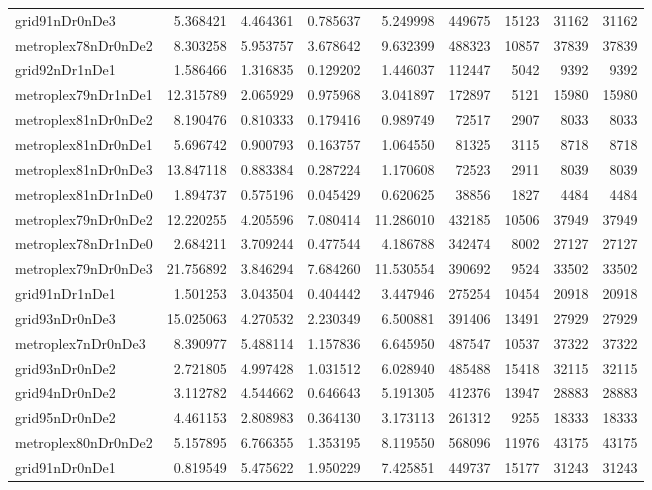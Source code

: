 \begin{longtable}{|l|r|r|r|r|r|r|r|r|}
grid91nDr0nDe3 & 5.368421 & 4.464361 & 0.785637 & 5.249998 & 449675 & 15123 & 31162 & 31162 \\
metroplex78nDr0nDe2 & 8.303258 & 5.953757 & 3.678642 & 9.632399 & 488323 & 10857 & 37839 & 37839 \\
grid92nDr1nDe1 & 1.586466 & 1.316835 & 0.129202 & 1.446037 & 112447 & 5042 & 9392 & 9392 \\
metroplex79nDr1nDe1 & 12.315789 & 2.065929 & 0.975968 & 3.041897 & 172897 & 5121 & 15980 & 15980 \\
metroplex81nDr0nDe2 & 8.190476 & 0.810333 & 0.179416 & 0.989749 & 72517 & 2907 & 8033 & 8033 \\
metroplex81nDr0nDe1 & 5.696742 & 0.900793 & 0.163757 & 1.064550 & 81325 & 3115 & 8718 & 8718 \\
metroplex81nDr0nDe3 & 13.847118 & 0.883384 & 0.287224 & 1.170608 & 72523 & 2911 & 8039 & 8039 \\
metroplex81nDr1nDe0 & 1.894737 & 0.575196 & 0.045429 & 0.620625 & 38856 & 1827 & 4484 & 4484 \\
metroplex79nDr0nDe2 & 12.220255 & 4.205596 & 7.080414 & 11.286010 & 432185 & 10506 & 37949 & 37949 \\
metroplex78nDr1nDe0 & 2.684211 & 3.709244 & 0.477544 & 4.186788 & 342474 & 8002 & 27127 & 27127 \\
metroplex79nDr0nDe3 & 21.756892 & 3.846294 & 7.684260 & 11.530554 & 390692 & 9524 & 33502 & 33502 \\
grid91nDr1nDe1 & 1.501253 & 3.043504 & 0.404442 & 3.447946 & 275254 & 10454 & 20918 & 20918 \\
grid93nDr0nDe3 & 15.025063 & 4.270532 & 2.230349 & 6.500881 & 391406 & 13491 & 27929 & 27929 \\
metroplex7nDr0nDe3 & 8.390977 & 5.488114 & 1.157836 & 6.645950 & 487547 & 10537 & 37322 & 37322 \\
grid93nDr0nDe2 & 2.721805 & 4.997428 & 1.031512 & 6.028940 & 485488 & 15418 & 32115 & 32115 \\
grid94nDr0nDe2 & 3.112782 & 4.544662 & 0.646643 & 5.191305 & 412376 & 13947 & 28883 & 28883 \\
grid95nDr0nDe2 & 4.461153 & 2.808983 & 0.364130 & 3.173113 & 261312 & 9255 & 18333 & 18333 \\
metroplex80nDr0nDe2 & 5.157895 & 6.766355 & 1.353195 & 8.119550 & 568096 & 11976 & 43175 & 43175 \\
grid91nDr0nDe1 & 0.819549 & 5.475622 & 1.950229 & 7.425851 & 449737 & 15177 & 31243 & 31243 \\

\end{longtable}
